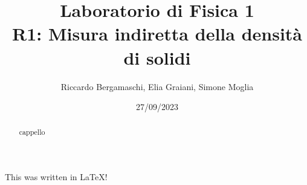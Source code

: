 \documentclass{article}
\title{
    Laboratorio di Fisica 1\\
    R1: Misura indiretta della densità di solidi
}
\author{Riccardo Bergamaschi, Elia Graiani, Simone Moglia}
\date{27/09/2023}
\begin{document}
\maketitle
\begin{abstract}
    cappello
\end{abstract}
This was written in \LaTeX !
\end{document}
